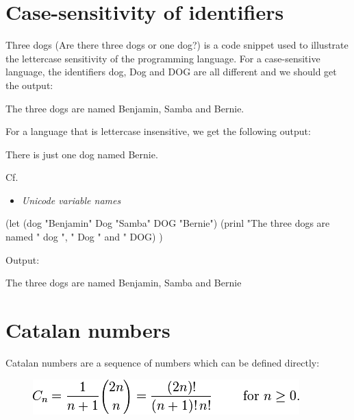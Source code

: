 \pagebreak{}
\section*{Case-sensitivity of identifiers}

Three dogs (Are there three dogs or one dog?) is a code snippet used to
illustrate the lettercase sensitivity of the programming language. For a
case-sensitive language, the identifiers dog, Dog and DOG are all
different and we should get the output:

The three dogs are named Benjamin, Samba and Bernie.

For a language that is lettercase insensitive, we get the following
output:

There is just one dog named Bernie.

\begin{description}
\item[Cf.]
\end{description}

\begin{itemize}
\item
  \emph{Unicode variable names}
\end{itemize}


\begin{wideverbatim}

(let (dog "Benjamin"  Dog "Samba"  DOG "Bernie")
   (prinl "The three dogs are named " dog ", " Dog " and " DOG) )

Output:

The three dogs are named Benjamin, Samba and Bernie
\end{wideverbatim}


\pagebreak{}
\section*{Catalan numbers}


Catalan numbers are a sequence of numbers which can be defined directly:

\begin{figure}[htbp]
\centering
\includegraphics[scale=.6]{graphics/3bd4ac77a4af3f894d8e88ed7e1ba418.png}
\end{figure}

